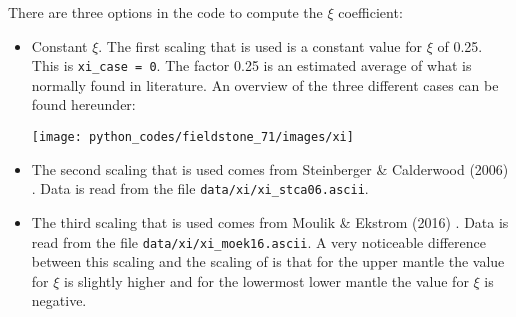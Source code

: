 There are three options in the code to compute the $\xi$ coefficient:
\begin{itemize}
\item Constant $\xi$. The first scaling that is used is a constant value for $\xi$ of 0.25. 
This is \texttt{xi\_case = 0}. The factor 0.25 is an estimated average of what is normally found in 
literature. An overview of the three different cases can be found hereunder:

\begin{center}
\texttt{[image: python\_codes/fieldstone\_71/images/xi]}
\end{center}

\item The second scaling that is used comes from Steinberger \& Calderwood (2006) \cite{stca06}. 
Data is read from the file \texttt{data/xi/xi\_stca06.ascii}. 

\item The third scaling that is used comes from Moulik \& Ekstrom (2016) \cite{moek16}. 
Data is read from the file \texttt{data/xi/xi\_moek16.ascii}. 
A very noticeable difference between this scaling and the scaling of \cite{stca06} 
is that for the upper mantle the value for $\xi$ is slightly higher and for the lowermost lower mantle 
the value for $\xi$ is negative.
\end{itemize}




